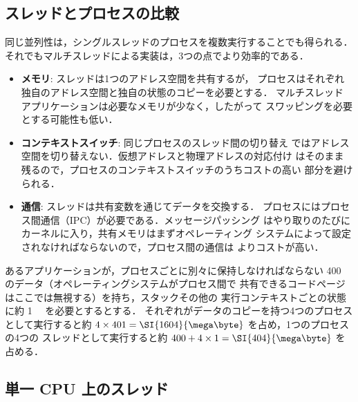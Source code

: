 \documentclass[../main.tex]{subfiles}
\begin{document}
\subsection{スレッドとプロセスの比較}

同じ並列性は，シングルスレッドのプロセスを複数実行することでも得られる．
それでもマルチスレッドによる実装は，3つの点でより効率的である．
\begin{itemize}
  \item \textbf{メモリ}: スレッドは1つのアドレス空間を共有するが，
    プロセスはそれぞれ独自のアドレス空間と独自の状態のコピーを必要とする．
    マルチスレッドアプリケーションは必要なメモリが少なく，したがって
    スワッピングを必要とする可能性も低い．
  \item \textbf{コンテキストスイッチ}: 同じプロセスのスレッド間の切り替え
    ではアドレス空間を切り替えない．仮想アドレスと物理アドレスの対応付け
    はそのまま残るので，プロセスのコンテキストスイッチのうちコストの高い
    部分を避けられる．
  \item \textbf{通信}: スレッドは共有変数を通じてデータを交換する．
    プロセスにはプロセス間通信（IPC）が必要である．メッセージパッシング
    はやり取りのたびにカーネルに入り，共有メモリはまずオペレーティング
    システムによって設定されなければならないので，プロセス間の通信は
    よりコストが高い．
\end{itemize}

\begin{example}
  あるアプリケーションが，プロセスごとに別々に保持しなければならない
  \SI{400}{\mega\byte} のデータ（オペレーティングシステムがプロセス間で
  共有できるコードページはここでは無視する）を持ち，スタックその他の
  実行コンテキストごとの状態に約 \SI{1}{\mega\byte} を必要とするとする．%
  それぞれがデータのコピーを持つ4つのプロセスとして実行すると約
  $4\times 401 = \SI{1604}{\mega\byte}$ を占め，1つのプロセスの4つの
  スレッドとして実行すると約 $400 + 4\times 1 = \SI{404}{\mega\byte}$
  を占める．
\end{example}

\subsection{単一 CPU 上のスレッド}
\end{document}
